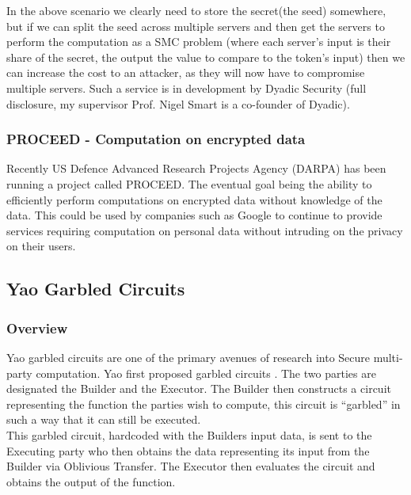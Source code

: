 \documentclass[a4paper,11pt]{article}
\begin{document}
				In the above scenario we clearly need to store the secret(the seed) somewhere, but if we can split the seed across multiple servers and then get the servers to perform the computation as a SMC problem (where each server's input is their share of the secret, the output the value to compare to the token's input) then we can increase the cost to an attacker, as they will now have to compromise multiple servers. Such a service is in development by Dyadic Security (full disclosure, my supervisor Prof. Nigel Smart is a co-founder of Dyadic).

			\subsubsection{PROCEED - Computation on encrypted data} \label{PROCEED_DARPA}
				Recently US Defence Advanced Research Projects Agency (DARPA) has been running a project called PROCEED. The eventual goal being the ability to efficiently perform computations on encrypted data without knowledge of the data. This could be used by companies such as Google to continue to provide services requiring computation on personal data without intruding on the privacy on their users.

		\subsection{Yao Garbled Circuits} \label{Yao_Circuits}

			\subsubsection{Overview} \label{Yao_Overview}
				Yao garbled circuits are one of the primary avenues of research into Secure multi-party computation. Yao first proposed garbled circuits \cite{YaoOriginal}. The two parties are designated the Builder and the Executor. The Builder then constructs a circuit representing the function the parties wish to compute, this circuit is ``garbled'' in such a way that it can still be executed.\\

				This garbled circuit, hardcoded with the Builders input data, is sent to the Executing party who then obtains the data representing its input from the Builder via Oblivious Transfer. The Executor then evaluates the circuit and obtains the output of the function.
\end{document}
